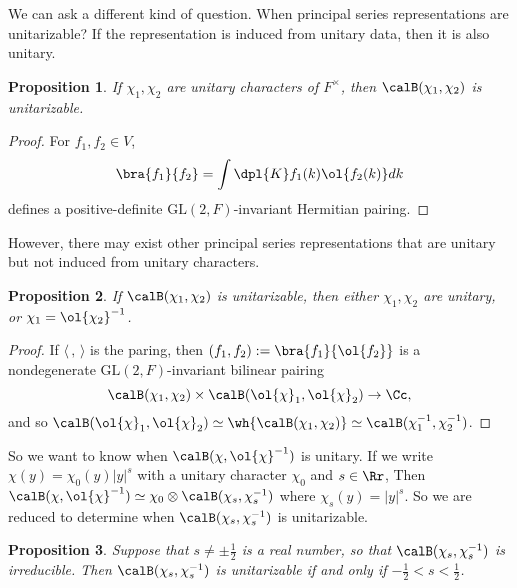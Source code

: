 \documentclass{article}
\newcommand{\GL}{\mathrm{GL}}
\newtheorem{proposition}{Proposition}[section]
\begin{document}
We can ask a different kind of question. When principal series representations are unitarizable? 
If the representation is induced from unitary data, then it is also unitary. 
\begin{proposition}
If $\chi_1, \chi_2$ are unitary characters of $F^{\times}$, then $\calB(\chi_1, \chi_2)$ is unitarizable. 
\end{proposition}
\begin{proof}
For $f_1, f_2\in V$,
$$
\bra{f_1}{f_2} = \int\dpl{K} f_1(k)\ol{f_2(k)} dk
$$
defines a positive-definite $\GL(2, F)$-invariant Hermitian pairing. 
\end{proof}
However, there may exist other principal series representations that are unitary but not induced from unitary characters.
\begin{proposition}
If $\calB(\chi_1, \chi_2)$ is unitarizable, then either $\chi_1, \chi_2$ are unitary, or $\chi_1 = \ol{\chi_2}^{-1}$. 
\end{proposition}
\begin{proof}
If $\langle \,,\,\rangle$ is the paring, then $(f_1, f_2) := \bra{f_1}{\ol{f_2}}$ is a nondegenerate $\GL(2, F)$-invariant bilinear pairing
$$
\calB(\chi_1, \chi_2) \times \calB(\ol{\chi}_1, \ol{\chi}_{2})\to \Cc,
$$
and so $\calB(\ol{\chi}_{1},  \ol{\chi}_2) \simeq \wh{\calB(\chi_{1}, \chi_2)} \simeq \calB(\chi_1^{-1}, \chi_2^{-1})$. 
\end{proof}
So we want to know when $\calB(\chi, \ol{\chi}^{-1})$ is unitary. 
If we write $\chi(y) = \chi_{0}(y) |y|^{s}$ with a unitary character $\chi_{0}$ and $s\in \Rr$, 
Then $\calB(\chi, \ol{\chi}^{-1})\simeq \chi_{0}\otimes \calB(\chi_s, \chi_s^{-1})$ where $\chi_s(y) = |y|^s$. 
So we are reduced to determine when $\calB(\chi_s, \chi_s^{-1})$ is unitarizable. 
\begin{proposition}
Suppose that $s\neq \pm\frac{1}{2}$ is a real number, so that $\calB(\chi_s, \chi_s^{-1})$ is irreducible. 
Then $\calB(\chi_s, \chi_s^{-1})$ is unitarizable if and only if $-\frac{1}{2} < s < \frac{1}{2}$. 
\end{proposition}
\end{document}
